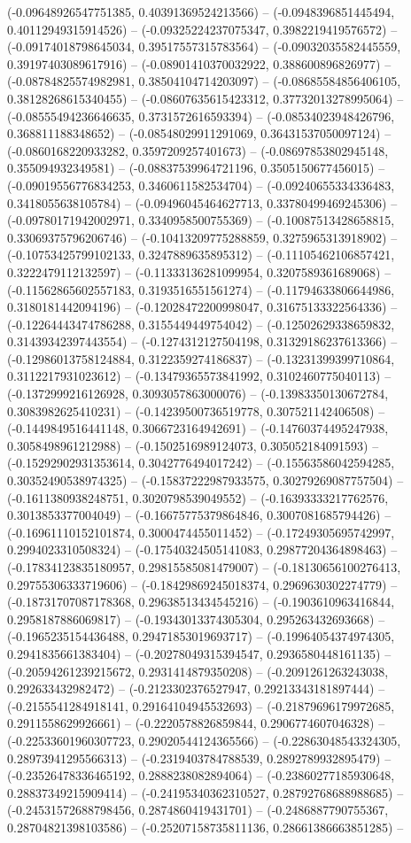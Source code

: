 (-0.09648926547751385, 0.40391369524213566) -- (-0.0948396851445494, 0.40112949315914526) -- (-0.09325224237075347, 0.3982219419576572) -- (-0.09174018798645034, 0.39517557315783564) -- (-0.09032035582445559, 0.39197403089617916) -- (-0.08901410370032922, 0.388600896826977) -- (-0.08784825574982981, 0.38504104714203097) -- (-0.08685584856406105, 0.38128268615340455) -- (-0.08607635615423312, 0.37732013278995064) -- (-0.08555494236646635, 0.3731572616593394) -- (-0.08534023948426796, 0.368811188348652) -- (-0.08548029911291069, 0.36431537050097124) -- (-0.0860168220933282, 0.3597209257401673) -- (-0.08697853802945148, 0.355094932349581) -- (-0.08837539964721196, 0.3505150677456015) -- (-0.09019556776834253, 0.3460611582534704) -- (-0.09240655334336483, 0.3418055638105784) -- (-0.09496045464627713, 0.33780499469245306) -- (-0.09780171942002971, 0.3340958500755369) -- (-0.10087513428658815, 0.33069375796206746) -- (-0.10413209775288859, 0.3275965313918902) -- (-0.10753425799102133, 0.3247889635895312) -- (-0.11105462106857421, 0.3222479112132597) -- (-0.11333136281099954, 0.3207589361689068) -- (-0.11562865602557183, 0.3193516551561274) -- (-0.11794633806644986, 0.3180181442094196) -- (-0.12028472200998047, 0.31675133322564336) -- (-0.12264443474786288, 0.3155449449754042) -- (-0.12502629338659832, 0.31439342397443554) -- (-0.1274312127504198, 0.31329186237613366) -- (-0.12986013758124884, 0.3122359274186837) -- (-0.13231399399710864, 0.3112217931023612) -- (-0.13479365573841992, 0.3102460775040113) -- (-0.1372999216126928, 0.3093057863000076) -- (-0.13983350130672784, 0.3083982625410231) -- (-0.14239500736519778, 0.307521142406508) -- (-0.1449849516441148, 0.3066723164942691) -- (-0.14760374495247938, 0.3058498961212988) -- (-0.1502516989124073, 0.305052184091593) -- (-0.15292902931353614, 0.3042776494017242) -- (-0.15563586042594285, 0.30352490538974325) -- (-0.15837222987933575, 0.30279269087757504) -- (-0.1611380938248751, 0.3020798539049552) -- (-0.16393333217762576, 0.3013853377004049) -- (-0.16675775379864846, 0.3007081685794426) -- (-0.16961110152101874, 0.3000474455011452) -- (-0.17249305695742997, 0.2994023310508324) -- (-0.17540324505141083, 0.29877204364898463) -- (-0.17834123835180957, 0.29815585081479007) -- (-0.18130656100276413, 0.29755306333719606) -- (-0.18429869245018374, 0.2969630302274779) -- (-0.18731707087178368, 0.29638513434545216) -- (-0.1903610963416844, 0.2958187886069817) -- (-0.19343013374305304, 0.295263432693668) -- (-0.1965235154436488, 0.29471853019693717) -- (-0.19964054374974305, 0.2941835661383404) -- (-0.20278049315394547, 0.2936580448161135) -- (-0.20594261239215672, 0.2931414879350208) -- (-0.2091261263243038, 0.292633432982472) -- (-0.2123302376527947, 0.29213343181897444) -- (-0.2155541284918141, 0.29164104945532693) -- (-0.21879696179972685, 0.2911558629926661) -- (-0.2220578826859844, 0.2906774607046328) -- (-0.22533601960307723, 0.29020544124365566) -- (-0.22863048543324305, 0.28973941295566313) -- (-0.2319403784788539, 0.2892789932895479) -- (-0.23526478336465192, 0.2888238082894064) -- (-0.23860277185930648, 0.28837349215909414) -- (-0.24195340362310527, 0.28792768688988685) -- (-0.24531572688798456, 0.2874860419431701) -- (-0.2486887790755367, 0.28704821398103586) -- (-0.25207158735811136, 0.28661386663851285) -- 